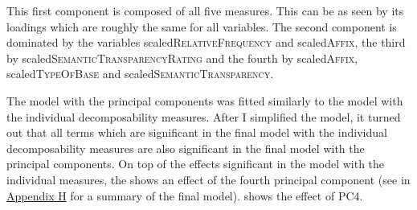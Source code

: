 \begin{table}[b]
	\caption{Summary of principal components}
	\label{tbl: summary PC im exp}
\end{table}



This first component is composed of all five measures. This can be as seen by its loadings which are roughly the same for all variables. The second component is dominated by the variables scaled\textsc{RelativeFrequency} and scaled\textsc{Affix}, the third by scaled\textsc{SemanticTransparencyRating} and the fourth by scaled\textsc{Affix}, scaled\textsc{TypeOfBase} and scaled\textsc{SemanticTransparency}. 


The model with the principal components was fitted similarly to the model with the individual decomposability measures. After I simplified the model, it turned out that all terms which are significant in the final model with the individual decomposability measures are also significant in the final model with the principal components. On top of the effects significant in the model with the individual measures, the  shows an effect of the fourth principal component (see  in \hyperref[Appendix H: Model Summaries Experiment]{Appendix H} for a summary of the final model).  shows the effect of \textsc{PC4}.

